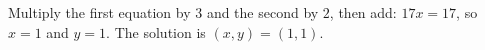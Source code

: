 Multiply the first equation by $3$ and the second by $2$, then add: $17x=17$, so $x=1$ and $y=1$. The solution is $\boxed{(x,y)=(1,1)}$.

